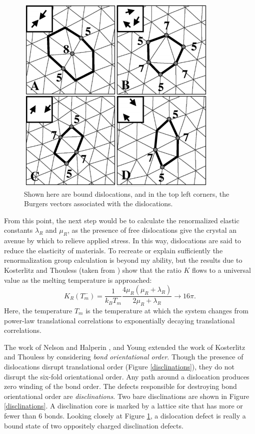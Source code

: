 \documentclass[a4paper,10pt]{article}
\newcommand{\beq}{\begin{equation}}
\newcommand{\eeq}{\end{equation}}
\newcommand{\lam}{\lambda}
\newcommand{\recip}[1]{\frac{1}{#1}}
\newcommand{\goto}{\rightarrow}
\begin{document}
\begin{figure}
 \centering
 \includegraphics[scale=0.4]{pointdefects.png}
 \caption{Shown here are bound dislocations, and in the top left corners, the 
Burgers vectors associated with the dislocations.}
\label{dislocations}
\end{figure}

From this point, the next step would be to calculate the renormalized elastic 
constants $\lam_R$ and $\mu_R$, as the presence of free dislocations give the 
crystal an avenue by which to relieve applied stress. In this way, dislocations 
are said to reduce the elasticity of materials. To recreate or explain 
sufficiently the renormalization group calculation is beyond my ability, but 
the results due to Kosterlitz and Thouless (taken from \cite{40years}) show 
that the ratio $K$ flows to a universal value as the melting temperature is 
approached:
\beq K_R(T_m^-) = \recip{k_BT_m}\frac{4\mu_R(\mu_R + \lam_R)}{2\mu_R + 
\lam_R} \goto 16\pi.\eeq
Here, the temperature $T_m$ is the temperature at which the system changes from 
power-law translational correlations to exponentially decaying translational 
correlations.

The work of Nelson and Halperin \cite{2dmelt}, and Young \cite{young} extended 
the work of Kosterlitz and Thouless by considering \emph{bond orientational 
order}. Though the presence of dislocations disrupt translational order (Figure 
\ref{disclinations}), they do not disrupt the six-fold orientational order. 
Any path around a dislocation produces zero winding of the bond order. The 
defects responsible for destroying bond orientational order are 
\emph{disclinations}. Two bare disclinations are shown in Figure 
\ref{disclinations}. A disclination core is marked by a lattice site that has 
more or fewer than 6 bonds. Looking closely at Figure \ref{dislocations}, a 
dislocation defect is really a bound state of two oppositely charged 
disclination defects.
\end{document}
